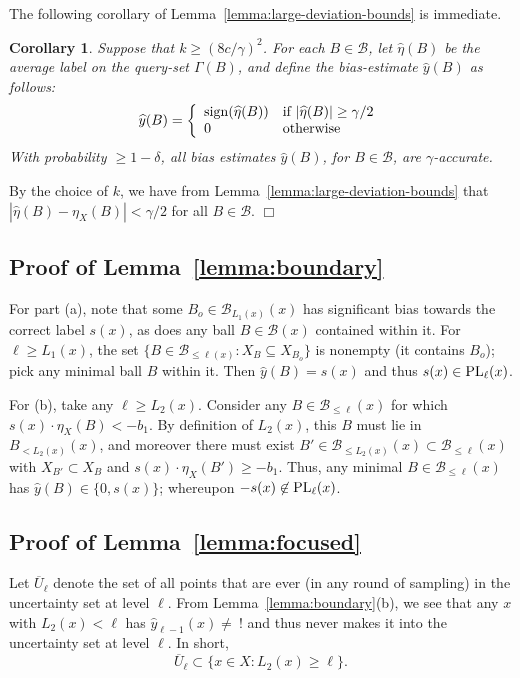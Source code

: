 \documentclass{article}
\def\B{{\mathcal B}}
\def\yh{{\widehat{y}}}
\def\sign{{\rm sign}}
\def\PL{{\mbox{\rm PL}}}
\newtheorem{cor}[thm]{Corollary}
\newenvironment{proof}{\noindent {\sc Proof:}}{$\Box$ \medskip}
\begin{document}
The following corollary of Lemma~\ref{lemma:large-deviation-bounds} is immediate.
\begin{cor}
Suppose that $k \geq (8c/\gamma)^2$. For each $B \in \B$, let $\widehat{\eta}(B)$ be the average label on the query-set $\Gamma(B)$, and define the bias-estimate $\yh(B)$ as follows:
$$ \yh(B)
= 
\left\{
\begin{array}{ll}
\sign(\widehat{\eta}(B)) & \mbox{if $|\widehat{\eta}(B)| \geq \gamma/2$} \\
0 & \mbox{otherwise}
\end{array}
\right.
$$
With probability $\geq 1-\delta$, all bias estimates $\yh(B)$, for $B \in \B$, are $\gamma$-accurate.
\label{cor:accurate-bias-estimates}
\end{cor}
\begin{proof}
By the choice of $k$, we have from Lemma~\ref{lemma:large-deviation-bounds} that 
$| \widehat{\eta}(B) - \eta_X(B) | < \gamma/2$
for all $B \in \B$.
\end{proof}

\subsection{Proof of Lemma~\ref{lemma:boundary}}

For part (a), note that some $B_o \in \B_{L_1(x)}(x)$ has significant bias towards the correct label $s(x)$, as does any ball $B \in \B(x)$ contained within it. For $\ell \geq L_1(x)$, the set $\{B \in \B_{\leq \ell(x)}: X_{B} \subseteq X_{B_o}\}$ is nonempty (it contains $B_o$); pick any minimal ball $B$ within it. Then $\yh(B) = s(x)$ and thus $s(x) \in \PL_\ell(x)$.

For (b), take any $\ell \geq L_2(x)$. Consider any $B \in \B_{\leq \ell}(x)$ for which $s(x) \cdot \eta_X(B) < -b_1$. By definition of $L_2(x)$, this $B$ must lie in $B_{< L_2(x)}(x)$, and moreover there must exist $B' \in \B_{\leq L_2(x)}(x) \subset \B_{\leq \ell}(x)$ with $X_{B'} \subset X_B$ and $s(x) \cdot \eta_X(B') \geq -b_1$. Thus, any minimal $B \in \B_{\leq \ell}(x)$ has $\yh(B) \in \{0, s(x)\}$; whereupon $-s(x) \not\in \PL_\ell(x)$.

\subsection{Proof of Lemma~\ref{lemma:focused}}

Let $\overline{U}_\ell$ denote the set of all points that are ever (in any round of sampling) in the uncertainty set at level $\ell$. From Lemma~\ref{lemma:boundary}(b), we see that any $x$ with $L_2(x) < \ell$ has $\yh_{\ell-1}(x) \neq \ !$ and thus never makes it into the uncertainty set at level $\ell$. In short,
\begin{equation}
\overline{U}_{\ell} \subset \{x \in X: L_2(x) \geq \ell\}.
\label{eq:uncertainty}
\end{equation}
\end{document}
